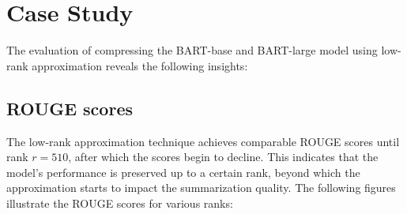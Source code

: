 
\section{Case Study}
The evaluation of compressing the BART-base and BART-large model using low-rank approximation reveals the following insights:

\subsection{ROUGE scores} The low-rank approximation technique achieves comparable ROUGE scores until rank \(r = 510\), after which the scores begin to decline. This indicates that the model's performance is preserved up to a certain rank, beyond which the approximation starts to impact the summarization quality. The following figures illustrate the ROUGE scores for various ranks:

